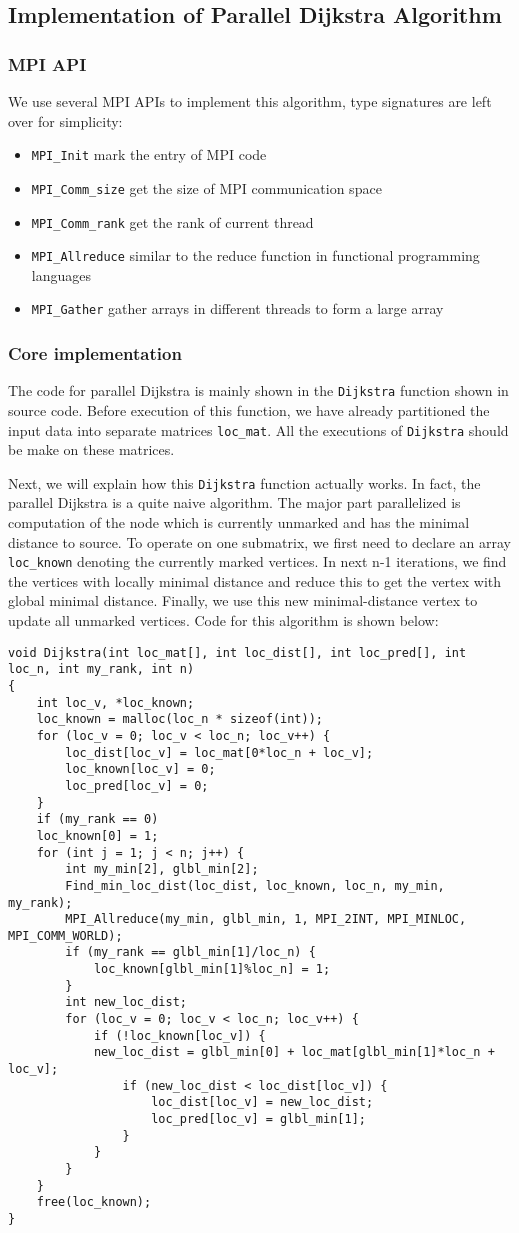 \documentclass{article}
\begin{document}
\subsection{Implementation of Parallel Dijkstra Algorithm}
\subsubsection{MPI API}
We use several MPI APIs to implement this algorithm, type signatures are left over for simplicity:
\begin{itemize}
	\item \verb|MPI_Init| mark the entry of MPI code
	\item \verb|MPI_Comm_size| get the size of MPI communication space
	\item \verb|MPI_Comm_rank| get the rank of current thread
	\item \verb|MPI_Allreduce| similar to the reduce function in functional programming languages
	\item \verb|MPI_Gather| gather arrays in different threads to form a large array
\end{itemize}
\subsubsection{Core implementation}
The code for parallel Dijkstra is mainly shown in the \verb|Dijkstra| function shown in source code. Before execution of this function, we have already partitioned the input data into separate matrices \verb|loc_mat|. All the executions of \verb|Dijkstra| should be make on these matrices.

Next, we will explain how this \verb|Dijkstra| function actually works. In fact, the parallel Dijkstra is a quite naive algorithm. The major part parallelized is computation of the node which is currently unmarked and has the minimal distance to source. To operate on one submatrix, we first need to declare an array \verb|loc_known| denoting the currently marked vertices. In next n-1 iterations, we find the vertices with locally minimal distance and reduce this to get the vertex with global minimal distance. Finally, we use this new minimal-distance vertex to update all unmarked vertices. Code for this algorithm is shown below:
\begin{lstlisting}
void Dijkstra(int loc_mat[], int loc_dist[], int loc_pred[], int loc_n, int my_rank, int n)
{
	int loc_v, *loc_known;
	loc_known = malloc(loc_n * sizeof(int));
	for (loc_v = 0; loc_v < loc_n; loc_v++) {
		loc_dist[loc_v] = loc_mat[0*loc_n + loc_v];
		loc_known[loc_v] = 0;
		loc_pred[loc_v] = 0;
	}
	if (my_rank == 0)
	loc_known[0] = 1;
	for (int j = 1; j < n; j++) {
		int my_min[2], glbl_min[2];
		Find_min_loc_dist(loc_dist, loc_known, loc_n, my_min, my_rank);
		MPI_Allreduce(my_min, glbl_min, 1, MPI_2INT, MPI_MINLOC, MPI_COMM_WORLD);
		if (my_rank == glbl_min[1]/loc_n) {
			loc_known[glbl_min[1]%loc_n] = 1;
		}
		int new_loc_dist;
		for (loc_v = 0; loc_v < loc_n; loc_v++) {
			if (!loc_known[loc_v]) {
			new_loc_dist = glbl_min[0] + loc_mat[glbl_min[1]*loc_n + loc_v];	
				if (new_loc_dist < loc_dist[loc_v]) {
					loc_dist[loc_v] = new_loc_dist;
					loc_pred[loc_v] = glbl_min[1];
				}
			}
		}
	}
	free(loc_known);
}
\end{lstlisting}
\end{document}
